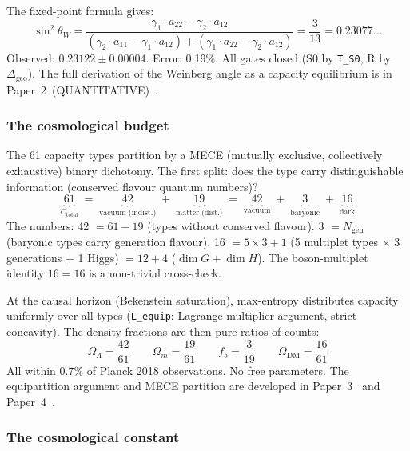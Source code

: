 \documentclass[11pt]{article}
\begin{document}
The fixed-point formula gives:
\begin{equation}
\sin^2\!\theta_W = \frac{\gamma_1 \cdot a_{22} - \gamma_2 \cdot a_{12}}{(\gamma_2 \cdot a_{11} - \gamma_1 \cdot a_{12}) + (\gamma_1 \cdot a_{22} - \gamma_2 \cdot a_{12})} = \frac{3}{13} = 0.23077\ldots
\end{equation}
Observed: $0.23122 \pm 0.00004$.  Error: 0.19\%.  All gates closed (S0 by \texttt{T\_S0}, R by $\Delta_{\mathrm{geo}}$).  The full derivation of the Weinberg angle as a capacity equilibrium is in Paper~2~(QUANTITATIVE)~\cite{P2Q}.


\subsubsection{The cosmological budget}

The 61 capacity types partition by a MECE (mutually exclusive, collectively exhaustive) binary dichotomy.  The first split: does the type carry distinguishable information (conserved flavour quantum numbers)?
\begin{equation}
\underbrace{61}_{C_{\mathrm{total}}} \;=\; \underbrace{42}_{\text{vacuum (indist.)}} \;+\; \underbrace{19}_{\text{matter (dist.)}} \;=\; \underbrace{42}_{\text{vacuum}} \;+\; \underbrace{3}_{\text{baryonic}} \;+\; \underbrace{16}_{\text{dark}}
\end{equation}
The numbers: 42 $= 61 - 19$ (types without conserved flavour).  3 $= N_{\mathrm{gen}}$ (baryonic types carry generation flavour).  16 $= 5\times 3 + 1$ (5 multiplet types $\times$ 3 generations $+$ 1 Higgs) $= 12 + 4$ ($\dim G + \dim H$).  The boson-multiplet identity $16 = 16$ is a non-trivial cross-check.

At the causal horizon (Bekenstein saturation), max-entropy distributes capacity uniformly over all types (\texttt{L\_equip}: Lagrange multiplier argument, strict concavity).  The density fractions are then pure ratios of counts:
\begin{equation}
\Omega_\Lambda = \frac{42}{61} \qquad \Omega_m = \frac{19}{61} \qquad f_b = \frac{3}{19} \qquad \Omega_{\mathrm{DM}} = \frac{16}{61}
\end{equation}
All within 0.7\% of Planck 2018 observations.  No free parameters.  The equipartition argument and MECE partition are developed in Paper~3~\cite{P3} and Paper~4~\cite{P4}.


\subsubsection{The cosmological constant}
\end{document}
